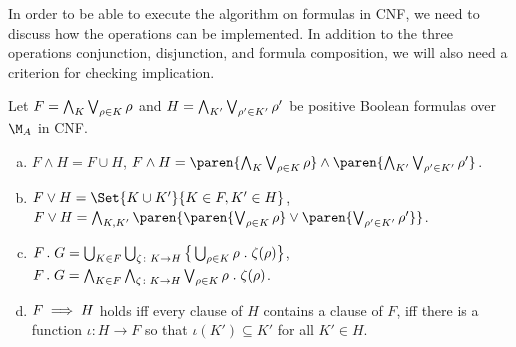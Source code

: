 \documentclass[../../diss.tex]{subfiles}
\begin{document}
In order to be able to execute the algorithm on formulas in CNF, we need to discuss how the operations can be implemented.
In addition to the three operations conjunction, disjunction, and formula composition, we will also need a criterion for checking implication.

\begin{lemma}%
\label{Lemma:CFGamesCNFOperations}%
    Let $F = \bigwedge_{K} \bigvee_{\tbox \in K} \tbox$ and $H = \bigwedge_{K'} \bigvee_{\tbox' \in K'} \tbox'$ be positive Boolean formulas over $\nfatransmonoid{A}$ in CNF.\@
    \begin{enumerate}[a)]
        \item
            $F \wedge H = F \cup H$,
            \ie $F \wedge H = \paren{ \bigwedge_{K} \bigvee_{\tbox \in K} \tbox} \wedge \paren{\bigwedge_{K'} \bigvee_{\tbox' \in K'} \tbox'}$.
        \item
            $F \vee H = \Set{ K \cup K' }{K \in F, K' \in H}$,
            \ie $F \vee H = \bigwedge_{K, K'} \paren{ \paren{ \bigvee_{\tbox \in K} \tbox } \vee  \paren{ \bigvee_{\tbox' \in K'} \tbox'} }$.
        \item
            $F \comp G = \bigcup_{K \in F} \bigcup_{\zeta \colon K \to H} \big\{ \bigcup_{\tbox \in K } \tbox \comp \zeta(\tbox)\big\}$,
            \ie $F \comp G = \bigwedge_{K \in F} \bigwedge_{\zeta \colon K \to H} \bigvee_{\tbox \in K } \tbox \comp \zeta(\tbox)$.
        \item
            $F \implies H$ holds iff every clause of $H$ contains a clause of $F$,
            \ie iff there is a function $\iota \colon H \to F$ so that $\iota(K') \subseteq K'$ for all $K' \in H$.
    \end{enumerate}
\end{lemma}
\end{document}
